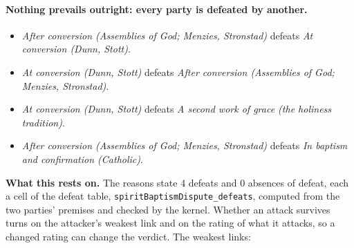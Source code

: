 \documentclass[11pt]{article}
\begin{document}
\paragraph{Nothing prevails outright: every party is defeated by another.}
\begin{itemize}
\item \emph{After conversion (Assemblies of God; Menzies, Stronstad)} defeats \emph{At conversion (Dunn, Stott)}.
\item \emph{At conversion (Dunn, Stott)} defeats \emph{After conversion (Assemblies of God; Menzies, Stronstad)}.
\item \emph{At conversion (Dunn, Stott)} defeats \emph{A second work of grace (the holiness tradition)}.
\item \emph{After conversion (Assemblies of God; Menzies, Stronstad)} defeats \emph{In baptism and confirmation (Catholic)}.
\end{itemize}
\par\noindent\textbf{What this rests on.} The reasons state 4 defeats and 0 absences of defeat, each a cell of the defeat table, \texttt{spirit\allowbreak{}Baptism\allowbreak{}Dispute\_\allowbreak{}defeats}, computed from the two parties' premises and checked by the kernel. Whether an attack survives turns on the attacker's weakest link and on the rating of what it attacks, so a changed rating can change the verdict. The weakest links:
\end{document}
